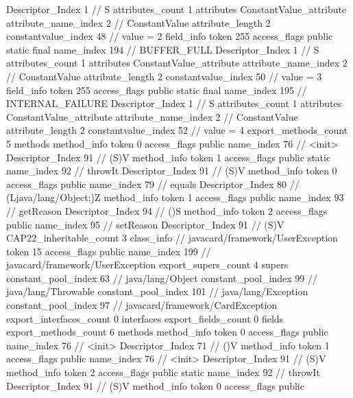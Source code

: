 {{{{{				Descriptor_Index	1		// S
				attributes_count	1
				attributes {
				ConstantValue_attribute {
					attribute_name_index	2		// ConstantValue
					attribute_length	2
					constantvalue_index	48		// value = 2
				}
				}
			}
			field_info {
				token	255
				access_flags	public static final
				name_index	194		// BUFFER_FULL
				Descriptor_Index	1		// S
				attributes_count	1
				attributes {
				ConstantValue_attribute {
					attribute_name_index	2		// ConstantValue
					attribute_length	2
					constantvalue_index	50		// value = 3
				}
				}
			}
			field_info {
				token	255
				access_flags	public static final
				name_index	195		// INTERNAL_FAILURE
				Descriptor_Index	1		// S
				attributes_count	1
				attributes {
				ConstantValue_attribute {
					attribute_name_index	2		// ConstantValue
					attribute_length	2
					constantvalue_index	52		// value = 4
				}
				}
			}
			}
			export_methods_count	5
			methods {
				method_info {
					token	0
					access_flags	public
					name_index	76		// <init>
					Descriptor_Index	91		// (S)V
				}
				method_info {
					token	1
					access_flags	public static
					name_index	92		// throwIt
					Descriptor_Index	91		// (S)V
				}
				method_info {
					token	0
					access_flags	public
					name_index	79		// equals
					Descriptor_Index	80		// (Ljava/lang/Object;)Z
				}
				method_info {
					token	1
					access_flags	public
					name_index	93		// getReason
					Descriptor_Index	94		// ()S
				}
				method_info {
					token	2
					access_flags	public
					name_index	95		// setReason
					Descriptor_Index	91		// (S)V
				}
			}
			CAP22_inheritable_count	3
		}
		class_info {		// javacard/framework/UserException
			token	15
			access_flags	public
			name_index	199		// javacard/framework/UserException
			export_supers_count	4
			supers {
				constant_pool_index	63		// java/lang/Object
				constant_pool_index	99		// java/lang/Throwable
				constant_pool_index	101		// java/lang/Exception
				constant_pool_index	97		// javacard/framework/CardException
			}
			export_interfaces_count	0
			interfaces {
			}
			export_fields_count	0
			fields {
			}
			export_methods_count	6
			methods {
				method_info {
					token	0
					access_flags	public
					name_index	76		// <init>
					Descriptor_Index	71		// ()V
				}
				method_info {
					token	1
					access_flags	public
					name_index	76		// <init>
					Descriptor_Index	91		// (S)V
				}
				method_info {
					token	2
					access_flags	public static
					name_index	92		// throwIt
					Descriptor_Index	91		// (S)V
				}
				method_info {
					token	0
					access_flags	public
}}}}}
